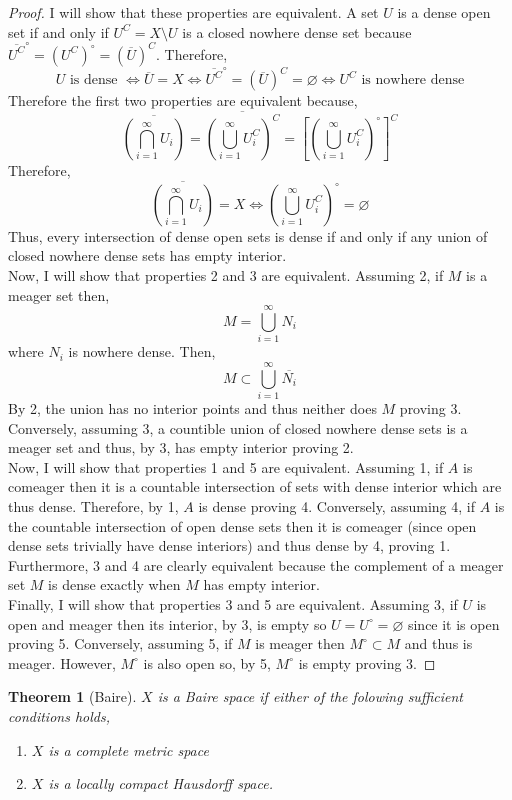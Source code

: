\documentclass{article}
\theoremstyle{theorem}
\newtheorem{theorem}{Theorem}[section]
\theoremstyle{definition}
\theoremstyle{definition}
\theoremstyle{remark}
\theoremstyle{definition}
\theoremstyle{remark}
\begin{document}
\begin{proof}
I will show that these properties are equivalent.
A set $U$ is a dense open set if and only if $U^C = X \setminus U$ is a closed nowhere dense set because $\overline{U^C}^\circ = (U^C)^\circ = (\overline{U})^C$. Therefore, 
\[ U \text{ is dense } \iff \overline{U} = X \iff \overline{U^C}^\circ = (\overline{U})^C = \varnothing \iff U^C \text{ is nowhere dense} \]
Therefore the first two properties are equivalent because,
\[ \overline{\left( \bigcap_{i = 1}^\infty U_i \right)} = \overline{\left( \bigcup_{i = 1}^{\infty} U_i^C \right)^C} = \left[ \left( \bigcup_{i = 1}^{\infty} U_i^C \right)^\circ \right]^C \]
Therefore,
\[ \overline{\left( \bigcap_{i = 1}^\infty U_i \right)} = X \iff \left( \bigcup_{i = 1}^{\infty} U_i^C \right)^\circ = \varnothing \]
Thus, every intersection of dense open sets is dense if and only if any union of closed nowhere dense sets has empty interior. 
\bigskip\\
Now, I will show that properties 2 and 3 are equivalent. Assuming 2, if $M$ is a meager set then,
\[ M = \bigcup_{i = 1}^\infty N_i \]
where $N_i$ is nowhere dense. Then,
\[ M \subset \bigcup_{i = 1}^\infty \overline{N_i}\] 
By 2, the union has no interior points and thus neither does $M$ proving 3. Conversely, assuming 3, a countible union of closed nowhere dense sets is a meager set and thus, by 3, has empty interior proving 2.
\bigskip\\
Now, I will show that properties 1 and 5 are equivalent. Assuming 1, if $A$ is comeager then it is a countable intersection of sets with dense interior which are thus dense. Therefore, by 1, $A$ is dense proving 4. Conversely, assuming 4, if $A$ is the countable intersection of open dense sets then it is comeager (since open dense sets trivially have dense interiors) and thus dense by 4, proving 1. Furthermore, 3 and 4 are clearly equivalent because the complement of a meager set $M$ is dense exactly when $M$ has empty interior.
\bigskip\\
Finally, I will show that properties 3 and 5 are equivalent. Assuming 3, if $U$ is open and meager then its interior, by 3, is empty so $U = U^\circ = \varnothing$ since it is open proving 5. Conversely, assuming 5, if $M$ is meager then $M^\circ \subset M$ and thus is meager. However, $M^\circ$ is also open so, by 5, $M^\circ$ is empty proving 3. 
\end{proof}

\begin{theorem}[Baire]
$X$ is a Baire space if either of the folowing sufficient conditions holds,
\begin{enumerate}
\item $X$ is a complete metric space
\item $X$ is a locally compact Hausdorff space.
\end{enumerate}
\end{theorem}
\end{document}
